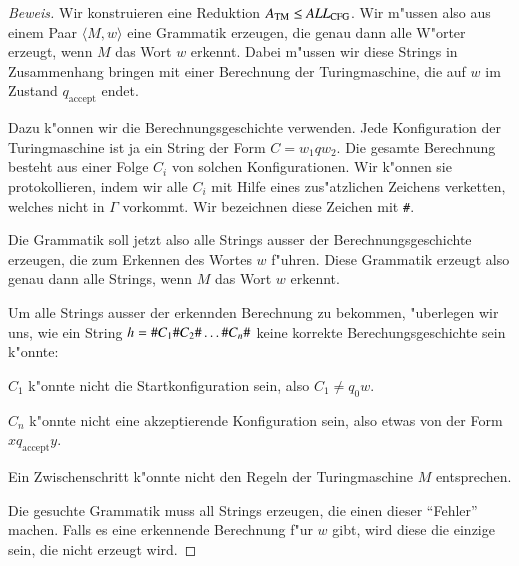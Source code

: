 \begin{proof}[Beweis]
Wir konstruieren eine Reduktion 
$A_{\text{TM}}\le \text{\it ALL}_{\text{CFG}}$.
Wir m"ussen also aus einem Paar $\langle M,w\rangle$ eine
Grammatik erzeugen, die genau dann alle W"orter erzeugt, wenn
$M$ das Wort $w$ erkennt.
Dabei m"ussen wir diese Strings in
Zusammenhang bringen mit einer Berechnung der Turingmaschine, die
auf $w$ im Zustand $q_{\text{accept}}$ endet.

Dazu k"onnen wir
die Berechnungsgeschichte verwenden.
Jede Konfiguration der
Turingmaschine ist ja ein String der Form $C=w_1qw_2$.
Die gesamte
Berechnung besteht aus einer Folge $C_i$ von solchen Konfigurationen.
Wir k"onnen sie protokollieren, indem wir alle $C_i$
mit Hilfe eines zus"atzlichen Zeichens verketten,
welches nicht in $\Gamma$ vorkommt.
Wir bezeichnen diese Zeichen
mit {\tt\#}.

Die Grammatik soll jetzt also alle Strings ausser der Berechnungsgeschichte
erzeugen, die zum Erkennen des Wortes $w$ f"uhren.
Diese Grammatik
erzeugt also genau dann alle Strings, wenn $M$ das Wort $w$ erkennt.

Um alle Strings ausser der erkennden Berechnung zu bekommen,
"uberlegen wir uns, wie ein String
$h={\tt\#}C_1{\tt\#}C_2{\tt\#}\dots{\tt\#}C_n{\tt\#}$
keine korrekte Berechungsgeschichte sein k"onnte:
\medskip
\begin{compactenum}
\item $C_1$ k"onnte nicht die Startkonfiguration sein, also
$C_1\ne q_0w$.
\item $C_n$ k"onnte nicht eine akzeptierende Konfiguration 
sein, also etwas von der Form $xq_{\text{accept}}y$.
\item Ein Zwischenschritt k"onnte nicht den Regeln der Turingmaschine
$M$ entsprechen.
\end{compactenum}
\medskip
Die gesuchte Grammatik muss all Strings erzeugen, die einen dieser ``Fehler''
machen.
Falls es eine erkennende Berechnung f"ur $w$ gibt, wird diese
die einzige sein, die nicht erzeugt wird.


\end{proof}
